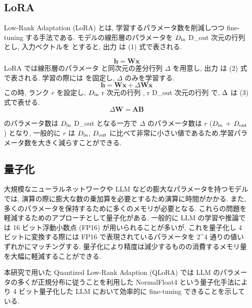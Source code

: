 \documentclass[twocolumn]{jarticle}
\begin{document}
\subsection{LoRA}
Low-Rank Adaptation (LoRA) \cite{LoRA} とは, 学習するパラメータ数を削減しつつ fine-tuning する手法である. モデルの線形層のパラメータを $D_{\rm{in}}$ \times D_{\rm{out}} 次元の行列  とし, 入力ベクトルを   とすると, 出力  は (1) 式で表される. \par
\begin{equation}
  \boldsymbol{h} = \boldsymbol{Wx}
\end{equation}
LoRA では線形層のパラメータ  と同次元の差分行列 $\Delta$ を用意し,  出力  は (2) 式で表される. 学習の際には  を固定し, $\Delta$ のみを学習する. 
\begin{equation}
  \boldsymbol{h} = \boldsymbol{Wx} + \Delta\boldsymbol{Wx}
\end{equation}
この時, ランク $r$ を設定し, $D_{\rm{in}}$ \times r \space 次元の行列 , r \times D_{\rm{out}} 次元の行列  で,   $\space \Delta$ は (3) 式で表せる. 
\begin{equation}
  \Delta\boldsymbol{W} = \boldsymbol{AB}
\end{equation}
 \par
{} のパラメータ数は $D_{\rm{in}}$ \times D_{\rm{out}} となる一方で  $\Delta$ のパラメータ数は $r$ ($D_{\rm{in}}$ + $D_{\rm{out}}$) となり, 一般的に $r$ は $D_{\rm{in}}$, $D_{\rm{out}}$ に比べて非常に小さい値であるため,学習パラメータ数を大きく減らすことができる.

\subsection{量子化}
大規模なニューラルネットワークや LLM などの膨大なパラメータを持つモデルでは, 演算の際に膨大な数の乗加算を必要とするため演算に時間がかかる. また, 多くのパラメータを保持するために多くのメモリが必要となる.
これらの問題を軽減するためのアプローチとして量子化がある.  一般的に LLM の学習や推論では 16 ビット浮動小数点 (FP16) が用いられることが多いが, これを量子化し 4 ビットに変換する際には FP16 で表現されているパラメータを 2^{4}  通りの値いずれかにマッチングする. 量子化により精度は減少するものの消費するメモリ量を大幅に軽減することができる.\par
本研究で用いた Quantized Low-Rank Adaption (QLoRA) \cite{QLoRA} では LLM のパラメータの多くが正規分布に従うことを利用した NormalFloat4 という量子化手法により 4 ビット量子化した LLM において効率的に fine-tuning できることを示している.
\end{document}
